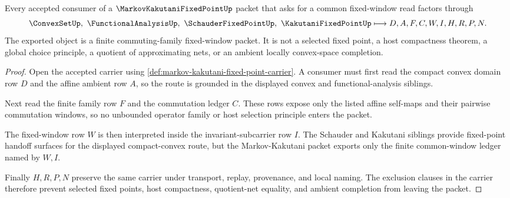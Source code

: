 \begin{theorem}\label{thm:markov-kakutani-fixed-point-commuting-handoff}
Every accepted consumer of a $\MarkovKakutaniFixedPointUp$ packet that asks for a common fixed-window read factors through
$$
\ConvexSetUp,\ \FunctionalAnalysisUp,\ \SchauderFixedPointUp,\ \KakutaniFixedPointUp
\longmapsto
D,A,F,C,W,I,H,R,P,N .
$$
The exported object is a finite commuting-family fixed-window packet. It is not a selected fixed point, a host compactness theorem, a global choice principle, a quotient of approximating nets, or an ambient locally convex-space completion.
\end{theorem}
\begin{proof}
Open the accepted carrier using \autoref{def:markov-kakutani-fixed-point-carrier}. A consumer must first read the compact convex domain row $D$ and the affine ambient row $A$, so the route is grounded in the displayed convex and functional-analysis siblings.

Next read the finite family row $F$ and the commutation ledger $C$. These rows expose only the listed affine self-maps and their pairwise commutation windows, so no unbounded operator family or host selection principle enters the packet.

The fixed-window row $W$ is then interpreted inside the invariant-subcarrier row $I$. The Schauder and Kakutani siblings provide fixed-point handoff surfaces for the displayed compact-convex route, but the Markov-Kakutani packet exports only the finite common-window ledger named by $W,I$.

Finally $H,R,P,N$ preserve the same carrier under transport, replay, provenance, and local naming. The exclusion clauses in the carrier therefore prevent selected fixed points, host compactness, quotient-net equality, and ambient completion from leaving the packet.
\end{proof}



